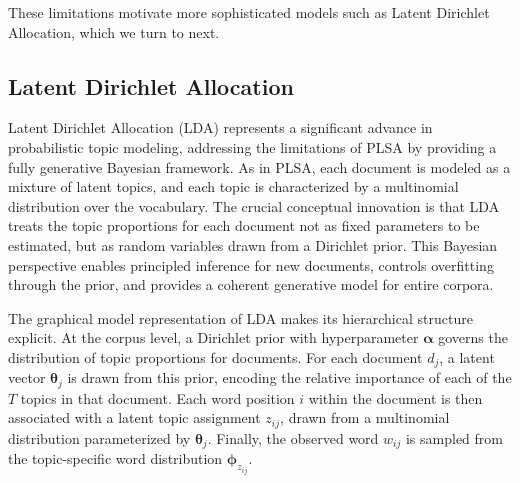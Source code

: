 These limitations motivate more sophisticated models such as Latent Dirichlet Allocation, which we turn to next.

\subsection*{Latent Dirichlet Allocation}

Latent Dirichlet Allocation (LDA) represents a significant advance in probabilistic topic modeling, addressing the limitations of PLSA by providing a fully generative Bayesian framework. As in PLSA, each document is modeled as a mixture of latent topics, and each topic is characterized by a multinomial distribution over the vocabulary. The crucial conceptual innovation is that LDA treats the topic proportions for each document not as fixed parameters to be estimated, but as random variables drawn from a Dirichlet prior. This Bayesian perspective enables principled inference for new documents, controls overfitting through the prior, and provides a coherent generative model for entire corpora.

The graphical model representation of LDA makes its hierarchical structure explicit. At the corpus level, a Dirichlet prior with hyperparameter $\boldsymbol{\alpha}$ governs the distribution of topic proportions for documents. For each document $d_j$, a latent vector $\boldsymbol{\theta}_j$ is drawn from this prior, encoding the relative importance of each of the $T$ topics in that document. Each word position $i$ within the document is then associated with a latent topic assignment $z_{ij}$, drawn from a multinomial distribution parameterized by $\boldsymbol{\theta}_j$. Finally, the observed word $w_{ij}$ is sampled from the topic-specific word distribution $\boldsymbol{\phi}_{z_{ij}}$.


